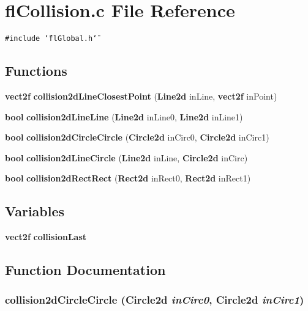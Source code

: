 \section{fl\-Collision.c File Reference}
\label{flCollision_8c}
{\tt \#include \char`\"{}fl\-Global.h\char`\"{}}\par
\subsection*{Functions}
\begin{CompactItemize}
\item 
{\bf vect2f} {\bf collision2d\-Line\-Closest\-Point} ({\bf Line2d} in\-Line, {\bf vect2f} in\-Point)
\item 
{\bf bool} {\bf collision2d\-Line\-Line} ({\bf Line2d} in\-Line0, {\bf Line2d} in\-Line1)
\item 
{\bf bool} {\bf collision2d\-Circle\-Circle} ({\bf Circle2d} in\-Circ0, {\bf Circle2d} in\-Circ1)
\item 
{\bf bool} {\bf collision2d\-Line\-Circle} ({\bf Line2d} in\-Line, {\bf Circle2d} in\-Circ)
\item 
{\bf bool} {\bf collision2d\-Rect\-Rect} ({\bf Rect2d} in\-Rect0, {\bf Rect2d} in\-Rect1)
\end{CompactItemize}
\subsection*{Variables}
\begin{CompactItemize}
\item 
{\bf vect2f} {\bf collision\-Last}
\end{CompactItemize}


\subsection{Function Documentation}
\subsubsection{ collision2d\-Circle\-Circle ({\bf Circle2d} {\em in\-Circ0}, {\bf Circle2d} {\em in\-Circ1})}\label{flCollision_8c_6a13d562d73bdbdbe4578c16fbc2d3b7}




